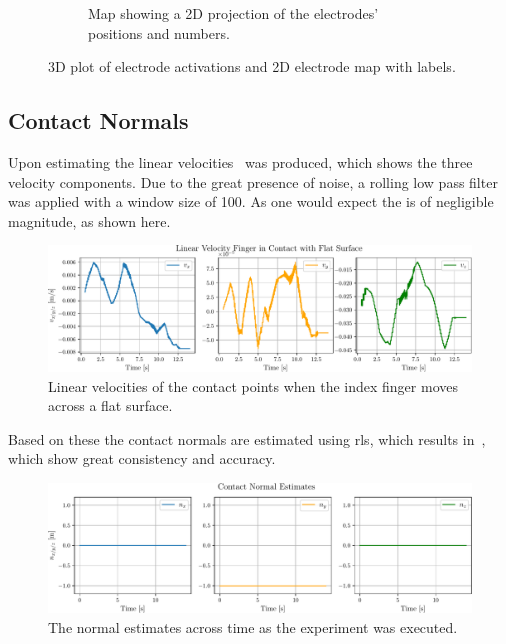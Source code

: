 \begin{figure}[h]
\begin{subfigure}[b]{0.48\textwidth}
		\caption{Map showing a 2D projection of the electrodes' positions and numbers.}
		\label{fig:electrode-map}
	\end{subfigure}
		\caption{3D plot of electrode activations and 2D electrode map with labels.}
		\label{fig:flat-contact-experimental-and-electrode-map}
\end{figure}

\subsection{Contact Normals} \label{sec:1-tactile-perception-results-contact-normals}

Upon estimating the linear velocities~ was produced, which shows the three velocity components. Due to the great presence of noise, a rolling low pass filter was applied with a window size of \num{100}. As one would expect the  is of negligible magnitude, as shown here. \medskip

\begin{figure}[!h]
	\begin{center}
		\includegraphics[width=\textwidth]{chapters/1-tactile-perception/fig/matplotlib/linear-velocity-finger-in-contact-with-flat-surface.pdf}
	\end{center}
	\caption{Linear velocities of the contact points when the index finger moves across a flat surface.}
	\label{fig:linear-velocity-finger-in-contact-with-flat-surface}
\end{figure}

Based on these the contact normals are estimated using \gls{rls}, which results in~, which show great consistency and accuracy.

\begin{figure}[!h]
	\begin{center}
		\includegraphics[width=\textwidth]{chapters/1-tactile-perception/fig/matplotlib/contact-normal-estimates.pdf}
	\end{center}
	\caption{The normal estimates across time as the experiment was executed.}
	\label{fig:contact-normal-estimates}
\end{figure}


